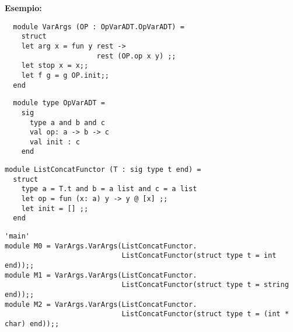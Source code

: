 \documentclass{article}
\begin{document}
\vspace*{0.5cm}

\hspace*{0.5cm}\textbf{Esempio:}

\vspace*{0.5cm}

\begin{minipage}{0.35\textwidth}
\begin{verbatim}
  module VarArgs (OP : OpVarADT.OpVarADT) =
    struct
    let arg x = fun y rest -> 
                      rest (OP.op x y) ;;
    let stop x = x;;
    let f g = g OP.init;;
  end
  \end{verbatim}
  \begin{verbatim}
  module type OpVarADT =
    sig
      type a and b and c
      val op: a -> b -> c
      val init : c
    end
  \end{verbatim}
\end{minipage}
\hfill
\begin{minipage}{0.6\textwidth}
\begin{verbatim}
module ListConcatFunctor (T : sig type t end) = 
  struct
    type a = T.t and b = a list and c = a list
    let op = fun (x: a) y -> y @ [x] ;;
    let init = [] ;;
  end
\end{verbatim}
\begin{verbatim}
'main'
module M0 = VarArgs.VarArgs(ListConcatFunctor.
                            ListConcatFunctor(struct type t = int end));;
module M1 = VarArgs.VarArgs(ListConcatFunctor.
                            ListConcatFunctor(struct type t = string end));;
module M2 = VarArgs.VarArgs(ListConcatFunctor.
                            ListConcatFunctor(struct type t = (int * char) end));;
\end{verbatim}

\end{minipage}
\end{document}
